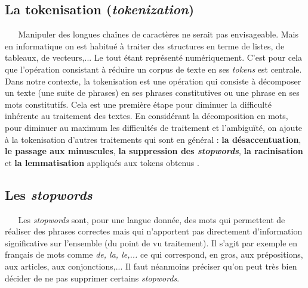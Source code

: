 \subsection{La tokenisation (\textit{tokenization})}
$ _{} $ $ _{} $ $ _{} $ $ _{} $ $ _{} $Manipuler des longues chaînes de caractères ne serait pas envisageable. Mais en informatique on est habitué à traiter des structures en terme de listes, de tableaux, de vecteurs,... Le tout étant représenté numériquement. C'est pour cela que l'opération consistant à réduire un corpus de texte en ses \textit{tokens} est centrale.\\
Dans notre contexte, la tokenisation est une opération qui consiste à décomposer un texte (une suite de phrases) en ses phrases constitutives ou une phrase en ses mots constitutifs. Cela est une première étape pour diminuer la difficulté inhérente au traitement des textes. En considérant la décomposition en mots, pour diminuer au maximum les difficultés de traitement et l'ambiguïté, on ajoute à la tokenisation d'autres traitements qui sont en général : \textbf{la désaccentuation}, \textbf{le passage aux minuscules}, \textbf{la suppression des \textit{stopwords}}, \textbf{la racinisation} et \textbf{la lemmatisation} appliqués aux tokens obtenus \cite{kulkarni2019natural}.\newpage
\subsection{Les \textit{stopwords} \cite{sarkar2019text}}
$ _{} $ $ _{} $ $ _{} $ $ _{} $ $ _{} $Les \textit{stopwords} sont, pour une langue donnée, des mots qui permettent de réaliser des phrases correctes mais qui n'apportent pas directement d'information significative sur l'ensemble (du point de vu traitement). Il s'agit par exemple en français de mots comme \textit{de, la, le,...} ce qui correspond, en gros, aux prépositions, aux articles, aux conjonctions,... Il faut néanmoins préciser qu'on peut très bien décider de ne pas supprimer certains \textit{stopwords}.
